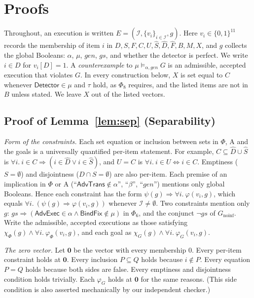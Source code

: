 \section{Proofs}\label{app:proofs}

Throughout, an execution is written $E=(\mathcal I,\{v_i\}_{i\in\mathcal I},g)$. Here
$v_i\in\{0,1\}^{11}$ records the membership of item $i$ in
$D,S,F,C,U,\hat S,\hat D,\hat F,B,M,X$, and $g$ collects the global Booleans: $\alpha$,
$\mu$, $\mathit{gen}$, $\mathit{gs}$, and whether the detector is perfect. We write
$i\in D$ for $v_i[D]=1$. A \emph{counterexample} to $\mu\models_{\alpha,\mathit{gen}}G$ is an
admissible, accepted execution that violates $G$. In every construction below, $X$ is set
equal to $C$ whenever $\textsf{Detector}\in\mu$ and $\tau$ hold, as $\Phi_8$ requires, and
the listed items are not in $B$ unless stated. We leave $X$ out of the listed vectors.

\subsection*{Proof of Lemma~\ref{lem:sep} (Separability)}

\emph{Form of the constraints.}
Each set equation or inclusion between sets in $\Phi$, $\mathrm A$ and the goals is a
universally quantified per-item statement. For example, $C\subseteq\hat D\cup\hat S$ is
$\forall i.\ i\in C\Rightarrow(i\in\hat D\vee i\in\hat S)$, and $U=C$ is
$\forall i.\ i\in U\Leftrightarrow i\in C$. Emptiness ($S=\emptyset$) and disjointness
($D\cap S=\emptyset$) are also per-item. Each premise of an implication in $\Phi$ or
$\mathrm A$ (``$\textsf{AdvTrans}\notin\alpha$'', ``$\beta$'', ``$\mathit{gen}$'') mentions
only global Booleans. Hence each constraint has the form
$\psi(g)\Rightarrow\forall i.\ \varphi(v_i,g)$, which equals
$\forall i.\ (\psi(g)\Rightarrow\varphi(v_i,g))$ whenever $\mathcal I\neq\emptyset$.
Two constraints mention only $g$:
$\mathit{gs}\Rightarrow(\textsf{AdvExec}\in\alpha\wedge\textsf{BindFix}\notin\mu)$ in
$\Phi_6$, and the conjunct $\neg\mathit{gs}$ of $G_{\mathrm{noinf}}$. Write the admissible,
accepted executions as those satisfying
$\chi_\Phi(g)\wedge\forall i.\ \varphi_\Phi(v_i,g)$, and each goal as
$\chi_G(g)\wedge\forall i.\ \varphi_G(v_i,g)$.

\emph{The zero vector.}
Let $\mathbf 0$ be the vector with every membership $0$. Every per-item constraint holds
at $\mathbf 0$. Every inclusion $P\subseteq Q$ holds because $i\notin P$. Every equation
$P=Q$ holds because both sides are false. Every emptiness and disjointness condition holds
trivially. Each $\varphi_G$ holds at $\mathbf 0$ for the same reasons. (This side condition
is also asserted mechanically by our independent checker.)

